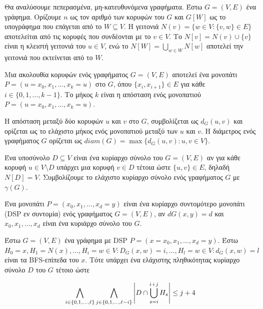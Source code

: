 Θα αναλύσουμε πεπερασμένα, μη-κατευθυνόμενα γραφήματα. Έστω $G = (V, E)$ ένα γράφημα. Ορίζουμε \( n \) ως τον αριθμό των κορυφών του \( G \) και \( G[W] \) ως το υπογράφημα που επάγεται από το \( W \subseteq V \). Η γειτονιά \( N(v) = \{w  \in V : \{v,w\} \in E\} \) αποτελείται από τις κορυφές που συνδέονται με το \( v \in V \). Το \( N[v] = N(v) \cup \{v\} \) είναι η κλειστή γειτονιά του \( u \in V \), ενώ το \( N[W] = \bigcup_{w \in W} N[w] \) αποτελεί την γειτονιά που εκτείνεται από το \( W \).

Μια ακολουθία κορυφών ενός γραφήματος \( G=(V, E) \) αποτελεί ένα μονοπάτι \( P=(u=x_0,x_1,\dots, x_k =u) \) στο \( G \), όπου \( \{x_i, x_{i+1}\} \in E \) για κάθε \( i \in \{0, 1, \dots,k-1\} \). Το μήκος \( k \) είναι η απόσταση ενός μονοπατιού \( P =(u=x_0, x_1, \dots, x_k=u) \).

Η απόσταση μεταξύ δύο κορυφών \( u \) και \( v \) στο \( G \), συμβολίζεται ως \( d_G (u,v) \) και ορίζεται ως το ελάχιστο μήκος ενός μονοπατιού μεταξύ των \( u \) και \( v \). Η διάμετρος ενός γραφήματος \( G \) ορίζεται ως \( diam(G) = \max \{d_G(u,v): u,v \in V \} \).

Ένα υποσύνολο \( D \subseteq V \) είναι ένα κυρίαρχο σύνολο του \( G = (V,E) \) αν για κάθε κορυφή \( u \in V \setminus D \) υπάρχει μια κορυφή \( v \in D \) τέτοια ώστε \( \{u, v\} \in E \), δηλαδή \( N[D] = V \). Συμβολίζουμε το ελάχιστο κυρίαρχο σύνολο ενός γραφήματος \( G \) με \( \gamma(G) \).

\begin{definition}
	Ένα μονοπάτι $P = (x_0, x_1,\dots , x_d =y)$ είναι ένα κυρίαρχο συντομότερο μονοπάτι (DSP εν συντομία) ενός γραφήματος $G=(V,E)$, αν $dG(x,y) = d$ και ${x_0, x_1, \dots , x_d}$ είναι ένα κυριάρχο σύνολο του $G$.
\end{definition}

\begin{theorem}
	\label{domination-set-dsp-theorem}
	Έστω $G = (V,E)$ ένα γράφημα με DSP $P =(x=x_0,x_1, \dots , x_d=y)$.  Έστω $H_0 ={x},H_1 = N(x),\dots ,H_i = {w \in V: D_G(x,w) = i}, \dots,H_l = {w \in V: d_G(x,w)=l}$
	είναι τα BFS-επίπεδα του $x$. Τότε υπάρχει ένα ελάχιστης πληθικότητας κυρίαρχο σύνολο $D$ του $G$ τέτοιο ώστε
\end{theorem}

\begin{center}
	\[
	\displaystyle \LARGE  \bigwedge_{i\in\{0,1,\ldots,\ell\}} \bigwedge_{j\in\{0,1,\ldots,\ell-i\}} \left|D\cap\bigcup_{s=i}^{i+j}H_{s}\right| \leq j+4
	\]
\end{center}


